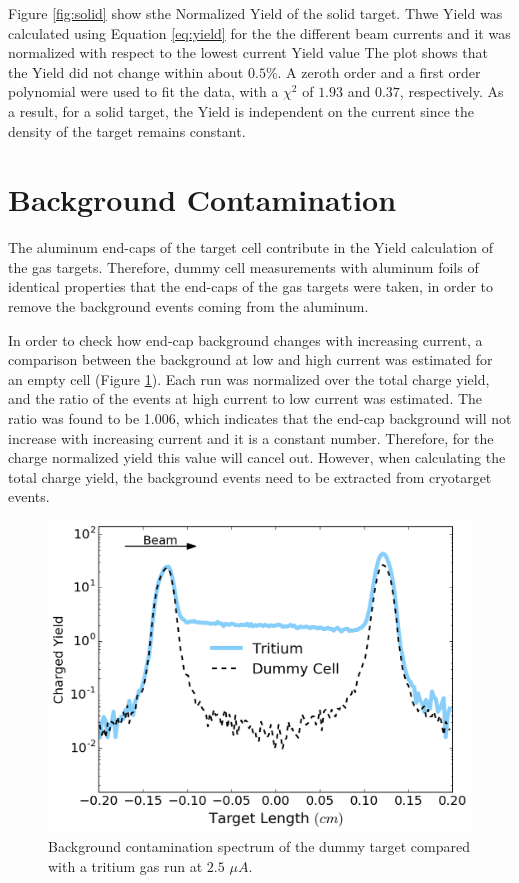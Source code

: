 \documentclass[final,5p,times,twocolumn]{elsarticle}
\begin{document}
Figure \ref{fig:solid} show sthe Normalized Yield of the solid target. Thwe Yield was calculated using Equation \ref{eq:yield} for the the different beam currents and it was normalized with respect to the lowest current Yield value The plot shows that the Yield did not change within about $0.5 \%$. A zeroth order and a first order polynomial were used to fit the data, with a $\chi ^{2}$ of $1.93$ and $0.37$, respectively. As a result, for a solid target, the Yield is independent on the current since the density of the target remains constant.

\section{Background Contamination}

The aluminum end-caps of the target cell contribute in the Yield calculation of the gas targets. Therefore, dummy cell measurements with aluminum foils of identical properties that the end-caps of the gas targets were taken, in order to remove the background events coming from the aluminum.

In order to check how end-cap background changes with increasing current, a
comparison between the background at low and high current was estimated for
an empty cell (Figure \ref{fig:bk_empty}). Each run was normalized over the total charge yield, and the ratio of the events at high current to low current was estimated. The ratio was found to be 1.006, which indicates that the end-cap background will not increase with increasing current and it is a constant number. Therefore, for the charge normalized yield this value will cancel out. However, when calculating the total charge yield, the background events need to be extracted from cryotarget events.

\begin{figure}[h]
 \centering
 \includegraphics[width=\linewidth]{images/contamination.pdf}
  \caption{Background contamination spectrum of the dummy target compared with a tritium gas run at $2.5$ $\mu A$.}
  \label{fig:bk_empty}
\end{figure}
\end{document}
